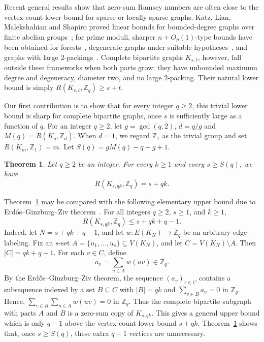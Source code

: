 ﻿\documentclass[11pt]{article}
\numberwithin{equation}{section}
\newtheorem{theorem}{Theorem}[section]
\theoremstyle{remark}
\newcommand{\Z}{\mathbb Z}
\begin{document}
Recent general results show that zero-sum Ramsey numbers are often close to the vertex-count lower bound for sparse or locally sparse graphs. Katz, Lian, Malekshahian and Shapiro proved linear bounds for bounded-degree graphs over finite abelian groups~\cite{KatzLianMalekshahianShapiro2025}; for prime moduli, sharper \(n+O_p(1)\)-type bounds have been obtained for forests~\cite{ColucciDEmidio2025}, degenerate graphs under suitable hypotheses~\cite{Shapiro2026}, and graphs with large \(2\)-packings~\cite{HeathSimmons2026}. Complete bipartite graphs \(K_{s,t}\), however, fall outside these frameworks when both parts grow: they have unbounded maximum degree and degeneracy, diameter two, and no large \(2\)-packing. Their natural lower bound is simply
\(R(K_{s,t},\mathbb Z_q)\ge s+t\).

Our first contribution is to show that for every integer $q\ge2$, this trivial lower bound is sharp for complete bipartite graphs, once \(s\) is sufficiently large as a function of \(q\).  
For an integer $q\ge2$, let $g=\gcd(q,2)$, $d=q/g$ and $M(q)=R(K_q,\Z_d)$.
When \(d=1\), we regard \(\Z_1\) as the trivial group and set \(R(K_m,\Z_1)=m\).
Let $S(q)=gM(q)-q-g+1$.

\begin{theorem}\label{thm:eventual-general}
    Let $q\ge2$ be an integer.
    For every $k\ge1$ and every $s\ge S(q)$, we have
    \[
        R(K_{s,qk},\Z_q)=s+qk.
    \]
\end{theorem}
Theorem~\ref{thm:eventual-general} may be compared with the following
elementary upper bound due to Erd\H{o}s--Ginzburg--Ziv theorem~\cite{EGZ1961}. For all integers \(q\ge2\), \(s\ge1\), and \(k\ge1\),
\[
    R(K_{s,qk},\Z_q)\le s+qk+q-1 .
\]
Indeed, let \(N=s+qk+q-1\), and let
\(w\colon E(K_N)\to\Z_q\) be an arbitrary edge-labeling. Fix an \(s\)-set
\(A=\{u_1,\ldots,u_s\}\subseteq V(K_N)\), and let
\(C=V(K_N)\setminus A\). Then \(|C|=qk+q-1\). For each \(v\in C\), define
\[
    a_v=\sum_{u\in A} w(uv)\in \Z_q .
\]
By the Erd\H{o}s--Ginzburg--Ziv theorem, the sequence
\((a_v)_{v\in C}\) contains a subsequence indexed by a set
\(B\subseteq C\) with \(|B|=qk\) and $\sum_{v\in B} a_v=0$ in $\Z_q$.  
Hence, $\sum_{v\in B}\sum_{u\in A} w(uv)=0$ in $\Z_q$. 
Thus the complete bipartite subgraph with parts \(A\) and \(B\) is a zero-sum copy of \(K_{s,qk}\). This gives a general upper bound which is only \(q-1\)
above the vertex-count lower bound \(s+qk\). Theorem~\ref{thm:eventual-general}
shows that, once \(s\ge S(q)\), these extra \(q-1\) vertices are unnecessary.
\end{document}
